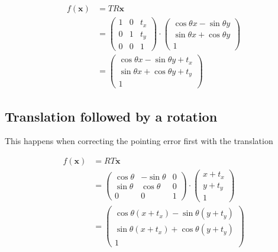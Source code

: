 \documentclass[paper=a4, fontsize=11pt, onecolumn, tikz, dvipsnames, svgnames, x11names]{article}
\begin{document}
\begin{align*}
    f(\bm{x}) &= TR\bm{x} \\
    &=
    \begin{pmatrix}
    1 & 0 & t_x \\
    0 & 1 & t_y \\
    0 & 0 & 1
    \end{pmatrix}
    \cdot
    \begin{pmatrix}
    \cos \theta x - \sin \theta y \\
    \sin \theta x + \cos \theta y \\
    1
    \end{pmatrix}
    \\
    &=
    \begin{pmatrix}
    \cos \theta x - \sin \theta y + t_x\\
    \sin \theta x + \cos \theta y + t_y\\
    1
    \end{pmatrix}
\end{align*}

\subsection{Translation followed by a rotation}
This happens when correcting the pointing error first with the translation

\begin{align*}
    f(\bm{x}) &= RT\bm{x} \\
    &=
    \begin{pmatrix}
    \cos \theta & -\sin \theta & 0 \\
    \sin \theta & \cos \theta & 0 \\
    0 & 0 & 1
    \end{pmatrix}
    \cdot
    \begin{pmatrix}
    x + t_x \\
    y + t_y \\
    1
    \end{pmatrix} \\
    &=
    \begin{pmatrix}
    \cos \theta (x + t_x) - \sin \theta (y + t_y)\\
    \sin \theta (x + t_x) + \cos \theta (y + t_y)\\
    1
    \end{pmatrix}
\end{align*}




\end{document}
